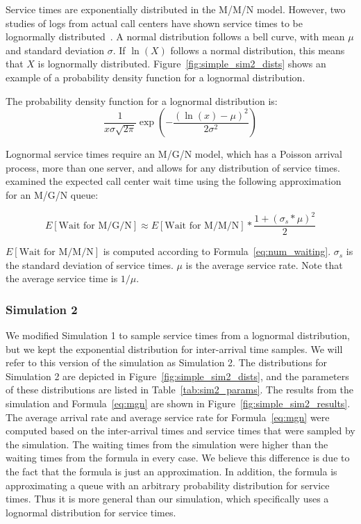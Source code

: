 Service times are exponentially distributed in the M/M/N model.
However, two studies of logs from actual call centers have shown service times
to be lognormally distributed~\cite{queue1, queue2}.
A normal distribution follows a bell curve, with mean $\mu$ and standard
deviation $\sigma$.
If $\ln{(X)}$ follows a normal distribution, this means that $X$ is lognormally
distributed.
Figure~\ref{fig:simple_sim2_dists} shows an example of a probability density
function for a lognormal distribution.

The probability density function for a lognormal distribution is:
\[
  \frac{1}{x \sigma \sqrt{2 \pi}}
  \exp{\left( - \frac{\left( \ln(x) - \mu \right)^2}{2 \sigma^2} \right)}
\]

Lognormal service times require an M/G/N model, which has a Poisson arrival
process, more than one server, and allows for any distribution of service times.
\citet{queue1} examined the expected call center wait time using the
following approximation for an M/G/N queue:

\begin{equation}
  E[\text{Wait for M/G/N}] \approx E[\text{Wait for M/M/N}] *
  \frac{1 + (\sigma_s * \mu)^2}{2}
\label{eq:mgn}
\end{equation}

$E[\text{Wait for M/M/N}]$ is computed according to
Formula~\ref{eq:num_waiting}.
$\sigma_s$ is the standard deviation of service times.
$\mu$ is the average service rate.
Note that the average service time is $1/\mu$.

\subsubsection{Simulation 2}

We modified Simulation 1 to sample service times from a lognormal
distribution, but we kept the exponential distribution for inter-arrival time
samples.
We will refer to this version of the simulation as Simulation 2.
The distributions for Simulation 2 are depicted in
Figure~\ref{fig:simple_sim2_dists}, and the parameters of these distributions
are listed in Table~\ref{tab:sim2_params}.
The results from the simulation and Formula~\ref{eq:mgn} are shown in
Figure~\ref{fig:simple_sim2_results}.
The average arrival rate and average service rate for Formula~\ref{eq:mgn} were
computed based on the inter-arrival times and service times that were sampled by
the simulation.
The waiting times from the simulation were higher than the waiting times from
the formula in every case.
We believe this difference is due to the fact that the formula is just an
approximation.
In addition, the formula is approximating a queue with an arbitrary probability
distribution for service times.
Thus it is more general than our simulation, which specifically uses a lognormal
distribution for service times.

